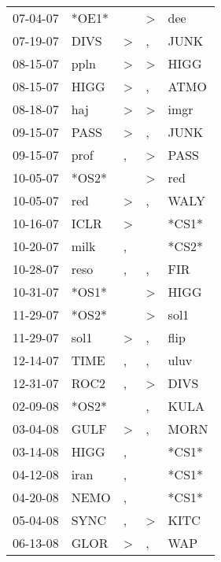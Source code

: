 \begin{supertabular}{lllll}
 07-04-07 &  *OE1* &                  &     \textgreater &    dee \\
 07-19-07 &   DIVS &     \textgreater &                , &   JUNK \\
 08-15-07 &   ppln &     \textgreater &     \textgreater &   HIGG \\
 08-15-07 &   HIGG &     \textgreater &                , &   ATMO \\
 08-18-07 &    haj &     \textgreater &     \textgreater &   imgr \\
 09-15-07 &   PASS &     \textgreater &                , &   JUNK \\
 09-15-07 &   prof &                , &     \textgreater &   PASS \\
 10-05-07 &  *OS2* &                  &     \textgreater &    red \\
 10-05-07 &    red &     \textgreater &                , &   WALY \\
 10-16-07 &   ICLR &     \textgreater &                  &  *CS1* \\
 10-20-07 &   milk &                , &                  &  *CS2* \\
 10-28-07 &   reso &                , &                , &    FIR \\
 10-31-07 &  *OS1* &                  &     \textgreater &   HIGG \\
 11-29-07 &  *OS2* &                  &     \textgreater &   sol1 \\
 11-29-07 &   sol1 &     \textgreater &                , &   flip \\
 12-14-07 &   TIME &                , &                , &   uluv \\
 12-31-07 &   ROC2 &                , &     \textgreater &   DIVS \\
 02-09-08 &  *OS2* &                  &                , &   KULA \\
 03-04-08 &   GULF &     \textgreater &                , &   MORN \\
 03-14-08 &   HIGG &                , &                  &  *CS1* \\
 04-12-08 &   iran &                , &                  &  *CS1* \\
 04-20-08 &   NEMO &                , &                  &  *CS1* \\
 05-04-08 &   SYNC &                , &     \textgreater &   KITC \\
 06-13-08 &   GLOR &     \textgreater &                , &    WAP \\

\end{supertabular}
